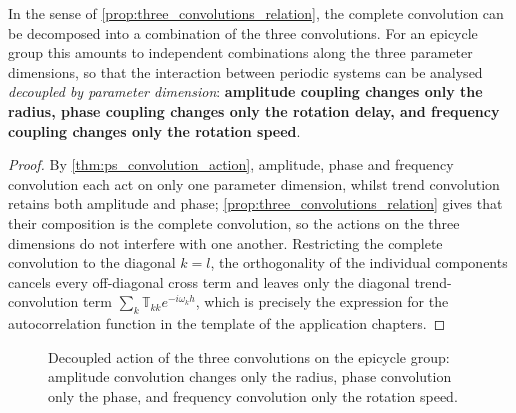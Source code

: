 \begin{proposition}\label{prop:ps_convolution_factorization}
In the sense of \cref{prop:three_convolutions_relation}, the complete convolution can be decomposed into a combination of the three convolutions. For an epicycle group this amounts to independent combinations along the three parameter dimensions, so that the interaction between periodic systems can be analysed \emph{decoupled by parameter dimension}: \textbf{amplitude coupling changes only the radius, phase coupling changes only the rotation delay, and frequency coupling changes only the rotation speed}.
\end{proposition}

\begin{proof}
By \cref{thm:ps_convolution_action}, amplitude, phase and frequency convolution each act on only one parameter dimension, whilst trend convolution retains both amplitude and phase; \cref{prop:three_convolutions_relation} gives that their composition is the complete convolution, so the actions on the three dimensions do not interfere with one another. Restricting the complete convolution to the diagonal $k=l$, the orthogonality of the individual components cancels every off-diagonal cross term and leaves only the diagonal trend-convolution term $\sum_k\mathbb T_{kk}e^{-i\omega_kh}$, which is precisely the expression for the autocorrelation function in the template of the application chapters.
\end{proof}

\begin{figure}[htbp]
\centering
{}
\caption{Decoupled action of the three convolutions on the epicycle group: amplitude convolution changes only the radius, phase convolution only the phase, and frequency convolution only the rotation speed.}
\label{fig:ps_convolution_decoupling}
\end{figure}

